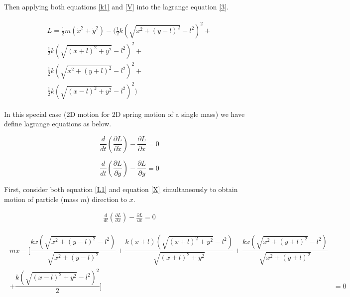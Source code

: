 Then applying both equations \eqref{k1} and \eqref{V} into the lagrange equation \eqref{3}. 



\begin{align}
\label{L1}
    \begin{split}
        L = \frac{1}{2}m(\dot{x}^2 + \dot{y}^2) - \bigg ( \frac{1}{2}k(\sqrt{x^2+(y-l)^2}- l^2 )^2 + \\ \frac{1}{2}k(\sqrt{(x+l)^2+y^2}- l^2 )^2 + \\ \frac{1}{2}k(\sqrt{x^2+(y+l)^2}- l^2 )^2  + \\\frac{1}{2}k(\sqrt{(x-l)^2+y^2}- l^2 )^2 \bigg )
    \end{split}
\end{align}

In this special case (2D motion for 2D spring motion of a single mass) we have define lagrange equations as below. 

\begin{equation}
    \label{X}
    \frac{d}{dt}(\frac{\partial L}{\partial \dot{x}})-\frac{\partial L}{\partial x}  = 0 
\end{equation}

\begin{equation}
    \label{Y}
     \frac{d}{dt}(\frac{\partial L}{\partial \dot{y}})-\frac{\partial L}{\partial y} = 0
\end{equation}

First, consider both equation \eqref{L1} and equation \eqref{X} simultaneously to obtain motion of particle (mass $m$) direction to $x$.

\begin{align*}
  \frac{d}{dt}(\frac{\partial L}{\partial \dot{x}})-\frac{\partial L}{\partial x}  = 0  
\end{align*}

\begin{align}
\label{X1}
\begin{split}
      m \Dot{x} - \bigg[ \dfrac{kx\left(\sqrt{x^2+\left(y-l\right)^2}-l^2\right)}{\sqrt{x^2+\left(y-l\right)^2}} +   { \dfrac{k\left(x+l\right)\left(\sqrt{\left(x+l\right)^2+y^2}-l^2\right)}{\sqrt{\left(x+l\right)^2+y^2}}
} +  \dfrac{kx\left(\sqrt{x^2+\left(y+l\right)^2}-l^2\right)}{\sqrt{x^2+\left(y+l\right)^2}} \\ + \dfrac{k\left(\sqrt{\left(x-l\right)^2+y^2}-l^2\right)^2}{2}
\bigg]& = 0 
    \end{split}
\end{align}


